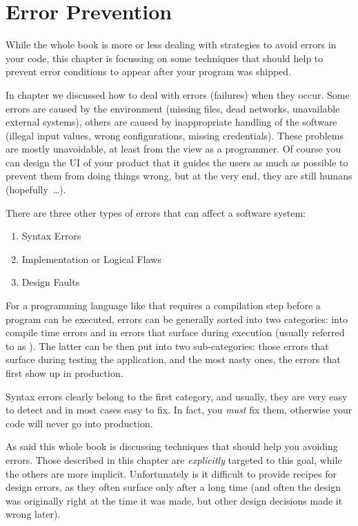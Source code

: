 \chapter{Error Prevention}\label{sec:ErrorPrevention}
While the whole book is more or less dealing with strategies to avoid errors in your code, this chapter is focussing on some techniques that should help to prevent error conditions to appear after your program was shipped.
 
In chapter  we discussed how to deal with errors (failures) when they occur. Some errors are caused by the environment (missing files, dead networks, unavailable external systems), others are caused by inappropriate handling of the software (illegal input values, wrong configurations, missing credentials). These problems are mostly unavoidable, at least from the view as a programmer. Of course you can design the UI of your product that it guides the users as much as possible to prevent them from doing things wrong, but at the very end, they are still humans (hopefully~…).

There are three other types of errors that can affect a software system:
\begin{enumerate}[nosep]
	\item{Syntax Errors}
	
	\item{Implementation or Logical Flaws}
	
	\item{Design Faults}
\end{enumerate}

For a programming language like \Java that requires a compilation step before a program can be executed, errors can be generally sorted into two categories: into compile time errors and in errors that surface during execution (usually referred to as ). The latter can be then put into two sub-categories: those errors that surface during testing the application, and the most nasty ones, the errors that first show up in production.

Syntax errors clearly belong to the first category, and usually, they are very easy to detect and in most cases easy to fix. In fact, you \textit{must} fix them, otherwise your code will never go into production.

As said this whole book is discussing techniques that should help you avoiding errors. Those described in this chapter are \textit{explicitly} targeted to this goal, while the others are more implicit. Unfortunately is it difficult to provide recipes for design errors, as they often surface only after a long time (and often the design was originally right at the time it was made, but other design decisions made it wrong later).

